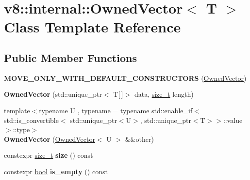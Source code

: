 \hypertarget{classv8_1_1internal_1_1OwnedVector}{}\section{v8\+:\+:internal\+:\+:Owned\+Vector$<$ T $>$ Class Template Reference}
\label{classv8_1_1internal_1_1OwnedVector}
\subsection*{Public Member Functions}
\begin{DoxyCompactItemize}
\item 
\mbox{\label{classv8_1_1internal_1_1OwnedVector_a8d5b11905370ad27acfa2ea4084dd1ca}} 
{\bfseries M\+O\+V\+E\+\_\+\+O\+N\+L\+Y\+\_\+\+W\+I\+T\+H\+\_\+\+D\+E\+F\+A\+U\+L\+T\+\_\+\+C\+O\+N\+S\+T\+R\+U\+C\+T\+O\+RS} (\mbox{\hyperlink{classv8_1_1internal_1_1OwnedVector}{Owned\+Vector}})
\item 
\mbox{\label{classv8_1_1internal_1_1OwnedVector_a97477af6e9addfa7eda3789e7961927c}} 
{\bfseries Owned\+Vector} (std\+::unique\+\_\+ptr$<$ T\mbox{[}$\,$\mbox{]}$>$ data, \mbox{\hyperlink{classsize__t}{size\+\_\+t}} length)
\item 
\mbox{\label{classv8_1_1internal_1_1OwnedVector_a59a2038d877906746b555b25a4a0fc8c}} 
{\footnotesize template$<$typename U , typename  = typename std\+::enable\+\_\+if$<$std\+::is\+\_\+convertible$<$                std\+::unique\+\_\+ptr$<$\+U$>$, std\+::unique\+\_\+ptr$<$\+T$>$$>$\+::value$>$\+::type$>$ }\\{\bfseries Owned\+Vector} (\mbox{\hyperlink{classv8_1_1internal_1_1OwnedVector}{Owned\+Vector}}$<$ U $>$ \&\&other)
\item 
\mbox{\label{classv8_1_1internal_1_1OwnedVector_a649fd98a862f21b359de9197b2c4ee11}} 
constexpr \mbox{\hyperlink{classsize__t}{size\+\_\+t}} {\bfseries size} () const
\item 
\mbox{\label{classv8_1_1internal_1_1OwnedVector_a8bb09d6491d0da6f89f23ae2fcbbb321}} 
constexpr \mbox{\hyperlink{classbool}{bool}} {\bfseries is\+\_\+empty} () const

\end{DoxyCompactItemize}
